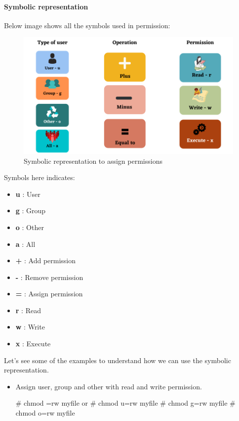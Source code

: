 \begin{flushleft}
	\paragraph{Symbolic representation}
	\bigskip
	Below image shows all the symbols used in permission:
	\begin{figure}[h!]
		\centering
		\includegraphics[scale=0.6]{content/chapter5/images/perm8.png}
		\bigskip
		\caption{Symbolic representation to assign permissions}
		\label{fig:assign_permission}
	\end{figure}
	
	Symbols here indicates:
	\begin{itemize}
		\item \textbf{u} : User
		\item \textbf{g} : Group
		\item \textbf{o} : Other
		\item \textbf{a} : All
		\item \textbf{+} : Add permission
		\item \textbf{-} : Remove permission
		\item \textbf{=} : Assign permission
		\item \textbf{r} : Read
		\item \textbf{w} : Write
		\item \textbf{x} : Execute
	\end{itemize}


	
	

	\newpage
	Let's see some of the examples to understand how we can use the symbolic representation.
	\begin{itemize}
	\item Assign user, group and other with read and write permission.
	\begin{tcolorbox}[breakable,notitle,boxrule=-0pt,colback=black,colframe=black]
		\color{green}
		\font=9pt
		\# chmod =rw myfile
		\newline
		or
		\newline
		\# chmod u=rw myfile
		\newline
		\# chmod g=rw myfile
		\newline
		\# chmod o=rw myfile
		\font=4pt
	\end{tcolorbox}
	\bigskip
		

\end{itemize}
\end{flushleft}
